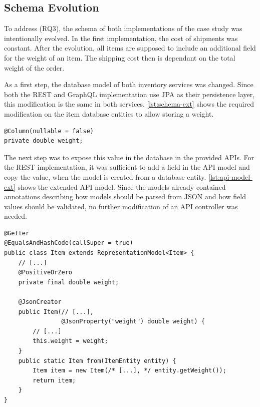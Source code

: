 \subsection{Schema Evolution}\label{sec:cs-schema-ev}

To address (RQ3), the schema of both implementations of the case study was intentionally evolved.
In the first implementation, the cost of shipments was constant.
After the evolution, all items are supposed to include an additional field for the weight of an item.
The shipping cost then is dependant on the total weight of the order.

As a first step, the database model of both inventory services was changed.
Since both the \ac{REST} and GraphQL implementation use \ac{JPA} as their persistence layer, this modification is the same in both services.
\autoref{lst:schema-ext} shows the required modification on the item database entities to allow storing a weight.

\begin{lstlisting}[style=java-ext, caption=Extended Database Schema of Items, label=lst:schema-ext]
@Column(nullable = false)
private double weight;
\end{lstlisting}

The next step was to expose this value in the database in the provided \acp{API}.
For the \ac{REST} implementation, it was sufficient to add a field in the \ac{API} model and copy the value, when the model is created from a database entity.
\autoref{lst:api-model-ext} shows the extended \ac{API} model.
Since the models already contained annotations describing how models should be parsed from \ac{JSON} and how field values should be validated, no further modification of an \ac{API} controller was needed.

\begin{minipage}{\linewidth}
\begin{lstlisting}[style=java-ext, caption=Extended \acs{API} Model for Items in the \ac{REST} Inventory Microservice, label=lst:api-model-ext]
@Getter
@EqualsAndHashCode(callSuper = true)
public class Item extends RepresentationModel<Item> {
    // [...]
    @PositiveOrZero
    private final double weight;
    
    @JsonCreator
    public Item(// [...],
                @JsonProperty("weight") double weight) {
        // [...]
        this.weight = weight;
    }
    public static Item from(ItemEntity entity) {
        Item item = new Item(/* [...], */ entity.getWeight());
        return item;
    }
}
\end{lstlisting}
\end{minipage}

